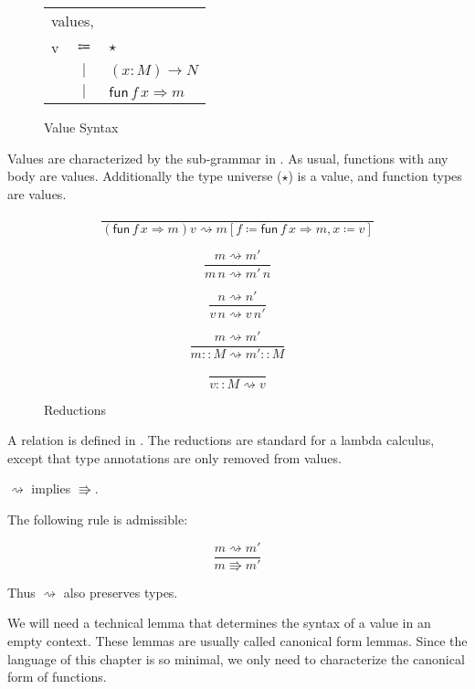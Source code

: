 \begin{figure}
\begin{tabular}{lcl}
\multicolumn{3}{l}{values,}\tabularnewline
v & $\Coloneqq$ & $\star$\tabularnewline
 & $|$ & $\left(x:M\right)\rightarrow N$\tabularnewline
 & $|$ & $\mathsf{fun}\,f\,x\Rightarrow m$\tabularnewline
\end{tabular}\caption{\SLang{} Value Syntax}
\label{fig:surface-value-syntax}
\end{figure}
 
Values are characterized by the sub-grammar in .
As usual, functions with any body are values.
Additionally the type universe ($\star$) is a value, and function types are values.
 
\begin{figure}
\[
\frac{\,}{\left(\mathsf{fun}\,f\,x\Rightarrow m\right)v\rightsquigarrow m\left[f\coloneqq\mathsf{fun}\,f\,x\Rightarrow m,x\coloneqq v\right]}
\]
 
\[
\frac{m\rightsquigarrow m'}{m\,n\rightsquigarrow m'\,n}
\]
 
\[
\frac{n\rightsquigarrow n'}{v\,n\rightsquigarrow v\,n'}
\]
 
\[
\frac{m\rightsquigarrow m'}{m::M\rightsquigarrow m'::M}
\]
 
\[
\frac{\,}{v::M\rightsquigarrow v}
\]
 
\caption{\SLang{} \CbV{} Reductions}
\label{fig:surface-reduction-step}
\end{figure}
 
A \cbv{} relation is defined in .
The reductions are standard for a \cbv{} lambda calculus, except that type annotations are only removed from values.
 
\begin{fact} $\rightsquigarrow$ implies $\Rrightarrow$.
 
The following rule is admissible:
 
\[
\frac{m\rightsquigarrow m'}{m\Rrightarrow m'}
\]
\end{fact}
 
Thus $\rightsquigarrow$ also preserves types.
 
We will need a technical lemma that determines the syntax of a value in an empty context.
These lemmas are usually called canonical form lemmas.
Since the language of this chapter is so minimal, we only need to characterize the canonical form of functions.
 
